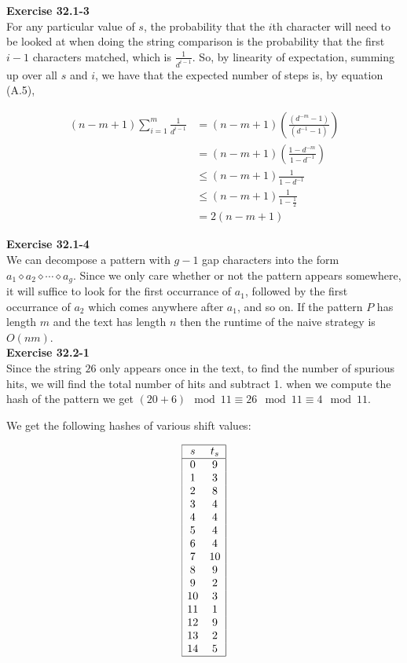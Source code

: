 \documentclass{article}
\begin{document}
\noindent\textbf{Exercise 32.1-3}\\

For any particular value of $s$, the probability that the $i$th character will need to be looked at when doing the string comparison is the probability that the first $i-1$ characters matched, which is $\frac{1}{d^{i-1}}$. So, by linearity of expectation, summing up over all $s$ and $i$, we have that the expected number of steps is, by equation (A.5),

\begin{align*}
(n-m+1) \sum_{i=1}^{m} \frac{1}{d^{i-1}}&=  (n-m+1)\left(\frac{(d^{-m}-1)}{(d^{-1}-1)}\right)\\
&= (n-m+1)(\frac{1-d^{-m}}{1-d^{-1}}) \\
&\le (n-m+1) \frac{1}{1-d^{-1}}\\
&\le (n-m+1) \frac{1}{1-\frac{1}{2}}\\
& = 2(n-m+1)
\end{align*}


\noindent\textbf{Exercise 32.1-4}\\

We can decompose a pattern with $g-1$ gap characters into the form $a_1 \diamond a_2 \diamond \cdots \diamond a_g$.  Since we only care whether or not the pattern appears somewhere, it will suffice to look for the first occurrance of $a_1$, followed by the first occurrance of $a_2$ which comes anywhere after $a_1$, and so on.  If the pattern $P$ has length $m$ and the text has length $n$ then the runtime of the naive strategy is $O(nm)$.\\

\noindent\textbf{Exercise 32.2-1}\\

Since the string $26$ only appears once in the text, to find the number of spurious hits, we will find the total number of hits and subtract 1. when we compute the hash of the pattern we get $(20 + 6)\mod 11 \equiv 26\mod 11 \equiv 4\mod 11$.

We get the following hashes of various shift values:

\[
\begin{array}{|cc|}
\hline 
s&t_s\\
\hline
0&9\\
1&3\\
2&8\\
3&4\\
4&4\\
5&4\\
6&4\\
7&10\\
8&9\\
9&2\\
10&3\\
11&1\\
12&9\\
13&2\\
14&5\\
\hline
\end{array}
\]
\end{document}

